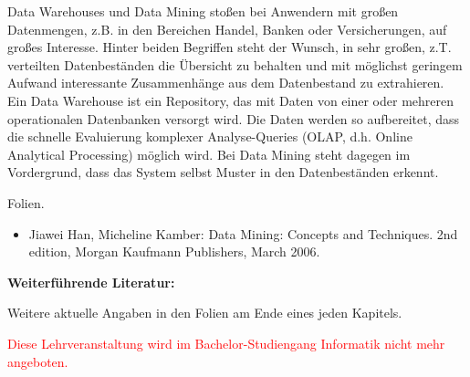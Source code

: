\begin{course}
\begin{learningoutcomes}
\end{learningoutcomes}

\begin{content}
Data Warehouses und Data Mining stoßen bei Anwendern mit großen Datenmengen, z.B. in den Bereichen Handel, Banken oder Versicherungen, auf großes Interesse. Hinter beiden Begriffen steht der Wunsch, in sehr großen, z.T. verteilten Datenbeständen die Übersicht zu behalten und mit möglichst geringem Aufwand interessante Zusammenhänge aus dem Datenbestand zu extrahieren. Ein Data Warehouse ist ein Repository, das mit Daten von einer oder mehreren operationalen Datenbanken versorgt wird. Die Daten werden so aufbereitet, dass die schnelle Evaluierung komplexer Analyse-Queries (OLAP, d.h. Online Analytical Processing) möglich wird. Bei Data Mining steht dagegen im Vordergrund, dass das System selbst Muster in den Datenbeständen erkennt.


\end{content}

\begin{media}Folien.

\end{media}

\begin{literature}\begin{itemize}\item Jiawei Han, Micheline Kamber: Data Mining: Concepts and Techniques. 2nd edition, Morgan Kaufmann Publishers, March 2006.  \end{itemize}

\textbf{Weiterführende Literatur:}

 

Weitere aktuelle Angaben in den Folien am Ende eines jeden Kapitels.

\end{literature}

\begin{remarks}\textcolor{red}{Diese Lehrveranstaltung wird im Bachelor-Studiengang Informatik nicht mehr angeboten.}

\end{remarks}

\end{course}